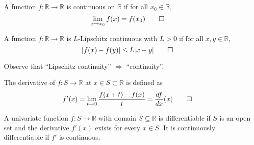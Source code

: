\documentclass[9pt, headings=standardclasses, parskip=half]{scrartcl}
\renewcommand{\emph}[1]{\textcolor{mypurple}{#1}}
\begin{document}
\begin{definition}[Continuity]
A function \(f:\mathbb{R}\rightarrow\mathbb{R}\) is \emph{continuous} on $\mathbb{R}$ if for all \(x_{0}\in\mathbb{R}\),
\[
\lim_{x\to x_{0}}f(x)=f(x_{0})
\qedhere
\]
\end{definition}

\begin{definition}
A function \(f:\mathbb{R}\rightarrow\mathbb{R}\) is \(L\)-\emph{Lipschitz continuous} with \(L>0\) if for all \(x,y\in\mathbb{R}\),
\[
|f(x)-f(y)|\leq L|x-y|
\qedhere
\]
\end{definition}

Observe that ``Lipschitz continuity'' $\Longrightarrow$ ``continuity''.

\begin{definition}[Derivative]
The derivative of \(f:S\rightarrow\mathbb{R}\) at \(x\in S\subset\mathbb{R}\) is defined as
\[
f'(x)=\lim_{t\to 0}\frac{f(x+t)-f(x)}{t}=\frac{df}{dx}(x)
\qedhere
\]
\end{definition}

\begin{definition}[Differentiability]
A univariate function \(f:S\rightarrow\mathbb{R}\) with domain \(S\subseteq\mathbb{R}\) is \emph{differentiable} if \(S\) is an open set and the derivative \(f'(x)\) exists for every \(x\in S\). It is \emph{continuously differentiable} if \(f'\) is continuous.
\end{definition}
\end{document}
